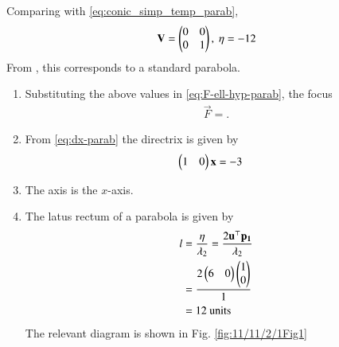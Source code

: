     Comparing with \eqref{eq:conic_simp_temp_parab},
\begin{align}
	\label{eq:chapters/11/11/2/1/eqV}
	\mathbf{V} = \begin{pmatrix} 0 & 0 \\ 0 & 1\end{pmatrix},\
	\eta = -12
\end{align}
					From , this corresponds to a standard parabola.  \begin{enumerate}
\item  Substituting the above values in 
					\eqref{eq:F-ell-hyp-parab},
the focus 
\begin{align}
	\vec{F} = .
\end{align}
\item 
					From \eqref{eq:dx-parab}
the directrix is given by
\begin{align}
\begin{pmatrix}1 & 0\end{pmatrix}\mathbf{x} &= -3
\end{align}
\item The axis is the $x$-axis.

\item The latus rectum of a parabola is given by 
\begin{align}
	l &= \frac{\eta}{\lambda_2}  
	 = \frac{2\mathbf{u}^\top\mathbf{p_1}}{\lambda_2} \\
	 &= \frac{2\begin{pmatrix}6 & 0\end{pmatrix}\begin{pmatrix}1 \\ 0\end{pmatrix}}{1} \\
	 &= 12 \text{ units }
\end{align}
The relevant diagram is shown in Fig. \ref{fig:11/11/2/1Fig1}
\begin{figure}[!h]
	\begin{center}

\end{center}
\end{figure}
\end{enumerate}
